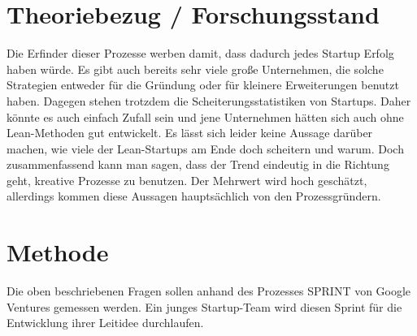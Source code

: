 \section{Theoriebezug / Forschungsstand}
Die Erfinder dieser Prozesse werben damit, dass dadurch jedes Startup Erfolg haben würde. Es gibt auch bereits sehr viele große Unternehmen, die solche Strategien entweder für die Gründung oder für kleinere Erweiterungen benutzt haben. Dagegen stehen trotzdem die Scheiterungsstatistiken von Startups. Daher könnte es auch einfach Zufall sein und jene Unternehmen hätten sich auch ohne Lean-Methoden gut entwickelt. Es lässt sich leider keine Aussage darüber machen, wie viele der Lean-Startups am Ende doch scheitern und warum. Doch zusammenfassend kann man sagen, dass der Trend eindeutig in die Richtung geht, kreative Prozesse zu benutzen. Der Mehrwert wird hoch geschätzt, allerdings kommen diese Aussagen hauptsächlich von den Prozessgründern.

\section{Methode}
Die oben beschriebenen Fragen sollen anhand des Prozesses SPRINT von Google Ventures gemessen werden. Ein junges Startup-Team wird diesen Sprint für die Entwicklung ihrer Leitidee durchlaufen. 


